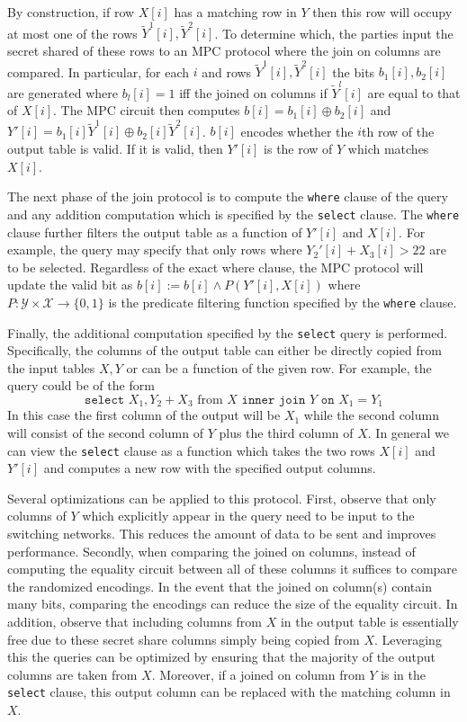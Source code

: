 By construction, if row $X[i]$ has a matching row in $Y$ then this row will occupy at most one of the rows ${\widetilde{Y}^1}[i],{\widetilde{Y}^2}[i]$. To determine which, the parties input the secret shared of these rows to an MPC protocol where the join on columns are compared. In particular, for each $i$ and rows ${\widetilde{Y}^1}[i],{\widetilde{Y}^2}[i]$ the bits $b_1[i],b_2[i]$ are generated where $b_l[i]=1$ iff the joined on columns if ${\widetilde{Y}^l}[i]$ are equal to that of $X[i]$. The MPC circuit then computes $b[i]=b_1[i]\oplus b_2[i]$ and $Y'[i]=b_1[i]{\widetilde{Y}^1}[i]\oplus b_2[i]{\widetilde{Y}^2}[i]$. $b[i]$ encodes whether the $i$th row of the output table is valid. If it is valid, then $Y'[i]$ is the row of $Y$ which matches $X[i]$.

The next phase of the join protocol is to compute the \texttt{where} clause of the query and any addition computation which is specified by the \texttt{select} clause. The \texttt{where} clause further filters the output table as a function of $Y'[i]$ and $X[i]$. For example, the query may specify that only rows where $Y_2'[i] + X_3[i] > 22$  are to be selected. Regardless of the exact where clause, the MPC protocol will update the valid bit as $b[i] := b[i] \wedge P(Y'[i], X[i])$ where $P: \mathcal{Y}\times \mathcal{X} \rightarrow \{0,1\}$ is the predicate filtering function specified by the \texttt{where} clause.

Finally, the additional computation specified by the \texttt{select} query is performed. Specifically, the columns of the output table can either be directly copied from the input tables $X,Y$ or can be a function of the given row. For example, the query could be of the form 
$$
\texttt{select } X_1, Y_2 + X_3 \text{ from } X \texttt{ inner join } Y \texttt{ on } X_1 = Y_1
$$
In this case the first column of the output will be $X_1$ while the second column will consist of the second column of $Y$ plus the third column of $X$. In general we can view the \texttt{select} clause as a function which takes the two rows $X[i]$ and $Y'[i]$ and computes a new row with the specified output columns. 

Several optimizations can be applied to this protocol. First, observe that only columns of $Y$ which explicitly appear in the query need to be input to the switching networks. This reduces the amount of data to be sent and improves performance. Secondly, when comparing the joined on columns, instead of computing the equality circuit between all of these columns it suffices to compare the randomized encodings. In the event that the joined on column(s) contain many bits, comparing the encodings can reduce the size of the equality circuit. In addition, observe that including columns from $X$ in the output table is essentially free due to these secret share columns simply being copied from $X$. Leveraging this the queries can be optimized by ensuring that the majority of the output columns are taken from $X$. Moreover, if a joined on column from $Y$ is in the \texttt{select} clause, this output column can be replaced with the matching column in $X$.

